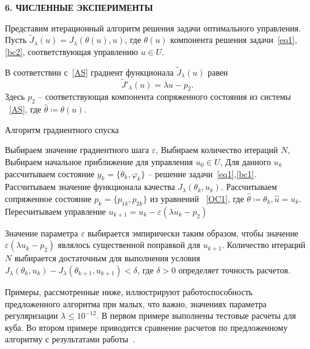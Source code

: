 \documentclass[12pt]{article}
\begin{document}
    \begin{center}
        \textbf{6. ЧИСЛЕННЫЕ ЭКСПЕРИМЕНТЫ}
    \end{center}

    Представим итерационный алгоритм решения задачи оптимального управления.
    Пусть $\tilde J_\lambda(u)=J_\lambda(\theta(u), u)$, где $\theta(u)$ компонента решения
    задачи~\eqref{eq1},\eqref{bc2}, соответствующая управлению $u\in U$.

    В соответствии с~\eqref{AS} градиент функционала $\tilde J_\lambda(u)$ равен
    \[ \tilde J'_\lambda (u) = \lambda u - p_2. \]
    Здесь $p_2$ -- соответствующая компонента сопряженного состояния из системы ~\eqref{AS},
    где $\hat{\theta}\coloneqq\theta(u)$.

    \begin{algorithm}[H]
        \caption{Алгоритм градиентного спуска}
        \label{alg:algorithm}
        \begin{algorithmic}[1]
            \State Выбираем значение градиентного шага $\varepsilon$,
            \State Выбираем количество итераций $N$,
            \State Выбираем начальное приближение для управления $u_0 \in U$,
                \State Для данного $u_k$ рассчитываем состояние $y_k = \{\theta_k, \varphi_k\}$ --
                решение задачи~\eqref{eq1},\eqref{bc1}.
                \State Рассчитываем значение функционала качества $J_\lambda(\theta_k, u_k)$.
                \State Рассчитываем сопряженное состояние $p_k=\{p_{1k},p_{2k}\}$ из уравнений ~\eqref{OC1},
                где $ \hat{\theta} \coloneqq \theta_k, \hat{u}=u_k$.
                \State Пересчитываем управление $u_{k+1} = u_k - \varepsilon (\lambda u_k - p_2)$
            \EndFor
        \end{algorithmic}
    \end{algorithm}
    Значение параметра $\varepsilon$ выбирается эмпирически таким образом, чтобы значение
    $\varepsilon (\lambda u_k - p_2)$ являлось существенной поправкой для $u_{k+1}$.
    Количество итераций $N$ выбирается достаточным для выполнения условия
    $J_\lambda(\theta_k, u_k) - J_\lambda(\theta_{k+1}, u_{k+1}) < \delta$, где $\delta>0$
    определяет точность расчетов.

    Примеры, рассмотренные ниже, иллюстрируют работоспособность предложенного алгоритма при
    малых, что важно, значениях параметра регуляризации $\lambda \leq 10^{-12}$.
    В первом примере выполнены тестовые расчеты для куба.
    Во втором примере приводится сравнение расчетов по
    предложенному алгоритму с результатами работы~\cite{CNSNS19}.
\end{document}
